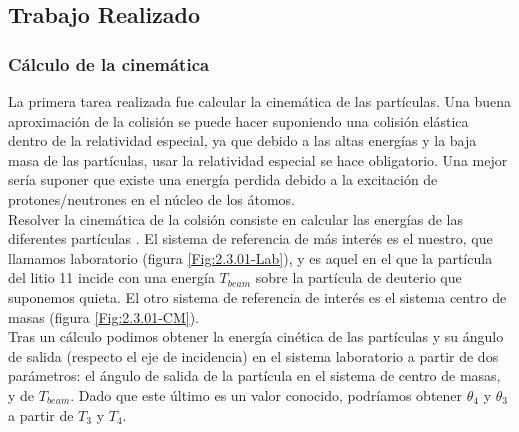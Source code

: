 \documentclass[12pt,a4paper]{article}
\numberwithin{equation}{section}
\numberwithin{figure}{section}
\begin{document}
\subsection{Trabajo Realizado}

\subsubsection{Cálculo de la cinemática}

La primera tarea realizada fue calcular la cinemática de las partículas. Una buena aproximación de la colisión se puede hacer suponiendo una colisión elástica dentro de la relatividad especial, ya que debido a las altas energías y la baja masa de las partículas, usar la relatividad especial se hace obligatorio. Una mejor sería suponer que existe una energía perdida debido a la excitación de protones/neutrones en el núcleo de los átomos.  \\

Resolver la cinemática de la colsión consiste en calcular las energías de las diferentes partículas . El sistema de referencia de más interés es el nuestro, que llamamos laboratorio (figura \ref{Fig:2.3.01-Lab}), y es aquel en el que la partícula del litio 11 incide con una energía $T_{beam}$ sobre la partícula de deuterio que suponemos quieta. El otro sistema de referencia de interés es el sistema centro de masas (figura \ref{Fig:2.3.01-CM}). \\

Tras un cálculo podimos obtener la energía cinética de las partículas y su ángulo de salida (respecto el eje de incidencia) en el sistema laboratorio a partir de dos parámetros: el ángulo de salida de la partícula en el sistema de centro de masas, y de $T_{beam}$. Dado que este último es un valor conocido, podríamos obtener $\theta_4$ y $\theta_3$ a partir de $T_3$ y $T_4$.   \\
\end{document}
